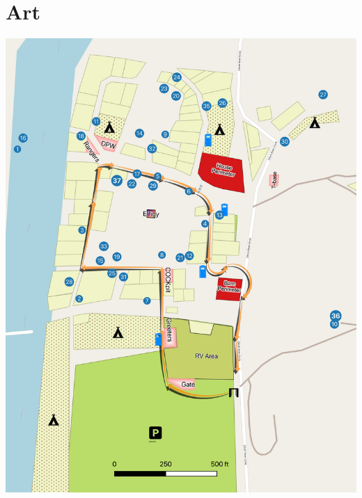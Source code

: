 %
%

\clearpage
\section*{Art}
\vspace*{\fill}
\begin{center}
	\includegraphics[width=.95\textwidth]{images/2019TTMArt}
\end{center}
\vspace*{\fill}

\clearpage
